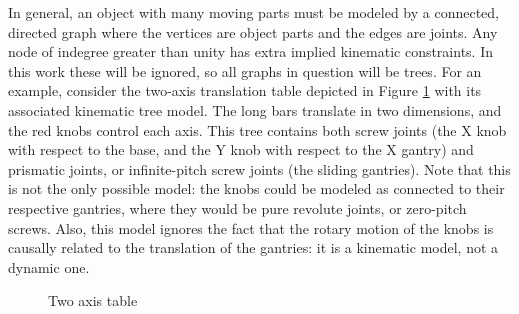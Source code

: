 \documentclass[letterpaper, 10 pt, conference]{ieeeconf}  %
\begin{document}
In general, an object with many moving parts must be modeled by a connected, directed graph where the vertices are object parts and the edges are joints.  Any node of indegree greater than unity has extra implied kinematic constraints. In this work these will be ignored, so all graphs in question will be trees. For an example, consider the two-axis translation table depicted in Figure \ref{fig:example} with its associated kinematic tree model. The long bars translate in two dimensions, and the red knobs control each axis. This tree contains both screw joints (the X knob with respect to the base, and the Y knob with respect to the X gantry) and prismatic joints, or infinite-pitch screw joints (the sliding gantries). Note that this is not the only possible model: the knobs could be modeled as connected to their respective gantries, where they would be pure revolute joints, or zero-pitch screws. Also, this model ignores the fact that the rotary motion of the knobs is causally related to the translation of the gantries: it is a kinematic model, not a dynamic one.

\begin{figure}[ht]
  \centering
  \caption{Two axis table}
  \label{fig:example}
\end{figure}
\end{document}

